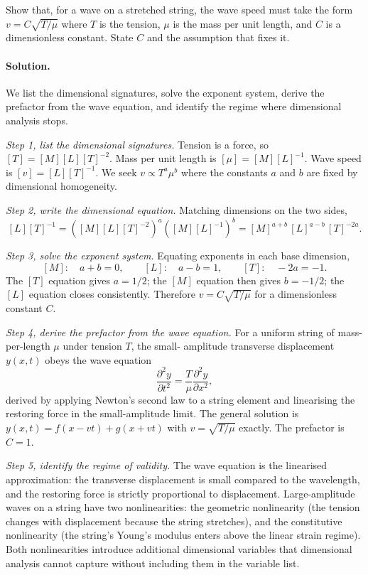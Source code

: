 \begin{exercise}
Show that, for a wave on a stretched string, the wave speed must
take the form $v = C\sqrt{T/\mu}$ where $T$ is the tension, $\mu$ is
the mass per unit length, and $C$ is a dimensionless constant. State
$C$ and the assumption that fixes it.

\paragraph{Solution.}
We list the dimensional signatures, solve the exponent system, derive
the prefactor from the wave equation, and identify the regime where
dimensional analysis stops.

\textit{Step 1, list the dimensional signatures.} Tension is a force,
so $[T] = [M][L][T]^{-2}$. Mass per unit length is
$[\mu] = [M][L]^{-1}$. Wave speed is $[v] = [L][T]^{-1}$. We seek
$v \propto T^{a} \mu^{b}$ where the constants $a$ and $b$ are fixed
by dimensional homogeneity.

\textit{Step 2, write the dimensional equation.} Matching dimensions
on the two sides,
\[
[L][T]^{-1}
= ([M][L][T]^{-2})^{a} ([M][L]^{-1})^{b}
= [M]^{a+b}\,[L]^{a-b}\,[T]^{-2a}.
\]

\textit{Step 3, solve the exponent system.} Equating exponents in each
base dimension,
\[
[M]: \quad a + b = 0, \qquad
[L]: \quad a - b = 1, \qquad
[T]: \quad -2a = -1.
\]
The $[T]$ equation gives $a = 1/2$; the $[M]$ equation then gives
$b = -1/2$; the $[L]$ equation closes consistently. Therefore
$v = C \sqrt{T/\mu}$ for a dimensionless constant $C$.

\textit{Step 4, derive the prefactor from the wave equation.} For a
uniform string of mass-per-length $\mu$ under tension $T$, the small-
amplitude transverse displacement $y(x, t)$ obeys the wave equation
\[
\frac{\partial^{2} y}{\partial t^{2}} = \frac{T}{\mu} \frac{\partial^{2}
y}{\partial x^{2}},
\]
derived by applying Newton's second law to a string element and
linearising the restoring force in the small-amplitude limit. The
general solution is $y(x, t) = f(x - vt) + g(x + vt)$ with
$v = \sqrt{T/\mu}$ exactly. The prefactor is $C = 1$.

\textit{Step 5, identify the regime of validity.} The wave equation is
the linearised approximation: the transverse displacement is small
compared to the wavelength, and the restoring force is strictly
proportional to displacement. Large-amplitude waves on a string have
two nonlinearities: the geometric nonlinearity (the tension changes
with displacement because the string stretches), and the constitutive
nonlinearity (the string's Young's modulus enters above the linear
strain regime). Both nonlinearities introduce additional dimensional
variables that dimensional analysis cannot capture without including
them in the variable list.


\end{exercise}
